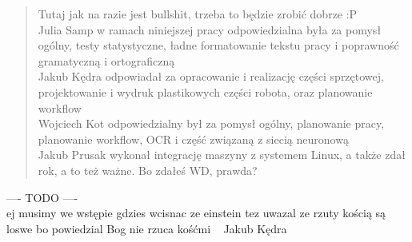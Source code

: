 \begin{quote}
    Tutaj jak na razie jest bullshit, trzeba to będzie zrobić dobrze :P \\
    Julia Samp w ramach niniejszej pracy odpowiedzialna była za pomysł ogólny, testy statystyczne, ładne formatowanie tekstu pracy i poprawność gramatyczną i ortograficzną \\
    Jakub Kędra odpowiadał za opracowanie i realizację części sprzętowej, projektowanie i wydruk plastikowych części robota, oraz planowanie workflow \\
    Wojciech Kot odpowiedzialny był za pomysł ogólny, planowanie pracy, planowanie workflow, OCR i część związaną z siecią neuronową \\
    Jakub Prusak wykonał integrację maszyny z systemem Linux, a także zdał rok, a to też ważne. Bo zdałeś WD, prawda? \\
\end{quote}


---- TODO ---- \\
ej musimy we wstępie gdzies wcisnac ze einstein tez uwazal ze rzuty kością są loswe bo powiedzial Bog nie rzuca kośćmi ~ Jakub Kędra


